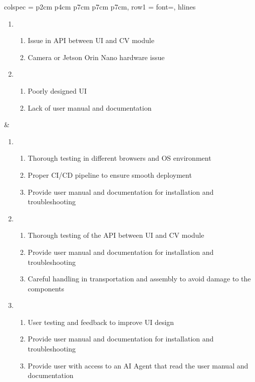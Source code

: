 \documentclass{article}
\begin{document}
\begin{table}[htbp]
{\begin{tblr}{
        colspec = {p{2cm} p{4cm} p{7cm} p{7cm} p{7cm}},
        row{1} = {font=\bfseries},
        hlines
      }
\begin{enumerate}
\begin{enumerate}
                \item Bug in the UI software
                \item Issue in CD pipeline
                \item Browser compatibility issue
                \item OS environment issue
              \end{enumerate}
        \item \begin{enumerate}
                \item Issue in API between UI and CV module
                \item Camera or Jetson Orin Nano hardware issue
              \end{enumerate}
        \item \begin{enumerate}
                \item Poorly designed UI
                \item Lack of user manual and documentation
              \end{enumerate}
      \end{enumerate}
                                              &
      \begin{enumerate}
        \item \begin{enumerate}
                \item Thorough testing in different browsers and OS environment
                \item Proper CI/CD pipeline to ensure smooth deployment
                \item Provide user manual and documentation for installation and troubleshooting
              \end{enumerate}
        \item \begin{enumerate}
                \item Thorough testing of the API between UI and CV module
                \item Provide user manual and documentation for installation and troubleshooting
                \item Careful handling in transportation and assembly to avoid damage to the
                      components
              \end{enumerate}
        \item \begin{enumerate}
                \item User testing and feedback to improve UI design
                \item Provide user manual and documentation for installation and troubleshooting
                \item Provide user with access to an AI Agent that read the user manual and
                      documentation
              \end{enumerate}
      \end{enumerate}


\end{tblr}}
\end{table}
\end{document}
